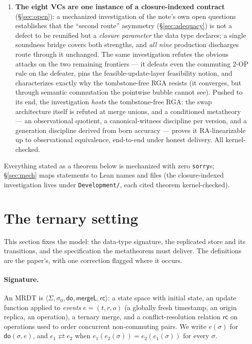 \documentclass[11pt]{article}
\newcommand{\comm}{\rightleftarrows}
\newcommand{\mergeL}{\mathsf{mergeL}}
\newcommand{\Sinit}{\sigma_0}
\newcommand{\lean}[1]{\texttt{#1}}
\begin{document}
\begin{enumerate}[leftmargin=2em]
  increment-only and PN counters, a tombstone RGA, and Peritext --- are
  discharged end-to-end, kernel-checked. The sweep produces an empirical
  \emph{class map} of which data types need which strength of contract,
  with two surprises: tombstones are a metatheoretic trivializer, and
  commutativity class and delta class are independent axes.
\item \textbf{The eight VCs are one instance of a closure-indexed
  contract} (\S\ref{sec:open}): a mechanized investigation of the note's
  own open questions establishes that the ``second route'' asymmetry
  (\S\ref{sec:adequacy}) is not a defect to be reunified but a
  \emph{closure parameter} the data type declares; a single soundness
  bridge covers both strengths, and \emph{all nine} production discharges
  route through it unchanged. The same investigation refutes the obvious
  attacks on the two remaining frontiers --- it defeats even the commuting
  \textsc{2-OP} rule on the defeater, pins the feasible-update-layer
  feasibility notion, and characterizes exactly why the tombstone-free RGA
  resists (it converges, but through semantic commutation the pointwise
  bubble cannot see). Pushed to its end, the investigation \emph{hosts}
  the tombstone-free RGA: the swap architecture itself is refuted at merge
  unions, and a conditioned metatheory --- an observational quotient, a
  canonical-witness discipline per version, and a generation discipline
  derived from born accuracy --- proves it RA-linearizable up to
  observational equivalence, end-to-end under honest delivery. All
  kernel-checked.
\end{enumerate}

Everything stated as a theorem below is mechanized with zero
\lean{sorry}s; \S\ref{sec:mech} maps statements to Lean names and files
(the closure-indexed investigation lives under \lean{Development/}, each
cited theorem kernel-checked).

\section{The ternary setting}
\label{sec:setting}

This section fixes the model: the data-type signature, the replicated
store and its transitions, and the specification the metatheorem must
deliver. The definitions are the paper's, with one correction flagged
where it occurs.

\paragraph{Signature.} An MRDT is $\langle \Sigma, \Sinit, \mathsf{do},
\mergeL, \mathsf{rc}\rangle$: a state space with initial state, an update
function applied to \emph{events} $e = (t, r, o)$ (a globally fresh
timestamp, an origin replica, an operation), a ternary merge, and a
conflict-resolution relation $\mathsf{rc}$ on operations used to order
concurrent non-commuting pairs. We write $e(\sigma)$ for
$\mathsf{do}(\sigma,e)$, and $e_1 \comm e_2$ when
$e_1(e_2(\sigma)) = e_2(e_1(\sigma))$ for every $\sigma$.
\end{document}
